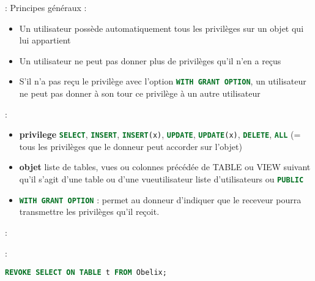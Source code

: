 \documentclass[10pt]{beamer}
\begin{document}
\begin{frame}{\secname : \subsecname}
    Principes généraux :
    \begin{itemize}
        \item Un utilisateur possède automatiquement tous les privilèges sur un objet qui lui appartient
        \item Un utilisateur ne peut pas donner plus de privilèges qu'il n'en a reçus
        \item S'il n'a pas reçu le privilège avec l'option \lstinline[language=sql]!WITH GRANT OPTION!, un utilisateur ne peut pas donner à son tour ce privilège à un autre utilisateur
    \end{itemize}
\end{frame}

\begin{frame}{\secname : \subsecname}
    
    \begin{itemize}
        \item \textbf{privilege} \lstinline[language=sql]!SELECT!, \lstinline[language=sql]!INSERT!, \lstinline[language=sql]!INSERT(x)!, \lstinline[language=sql]!UPDATE!, \lstinline[language=sql]!UPDATE(x)!, \lstinline[language=sql]!DELETE!, \lstinline[language=sql]!ALL! (= tous les privilèges que le donneur peut accorder sur l'objet)
        \item \textbf{objet} liste de tables, vues ou colonnes précédée de TABLE ou VIEW suivant qu'il s'agit d'une table ou d'une vueutilisateur liste d'utilisateurs ou \lstinline[language=sql]!PUBLIC!
        \item \lstinline[language=sql]!WITH GRANT OPTION! : permet au donneur d'indiquer que le receveur pourra transmettre les privilèges qu'il reçoit.
    \end{itemize}

\end{frame}


\begin{frame}{\secname : \subsecname}
    
\end{frame}

\begin{frame}{\secname : \subsecname}
    
    \lstinline[language=sql]!REVOKE SELECT ON TABLE t FROM Obelix;!
\end{frame}
\end{document}
